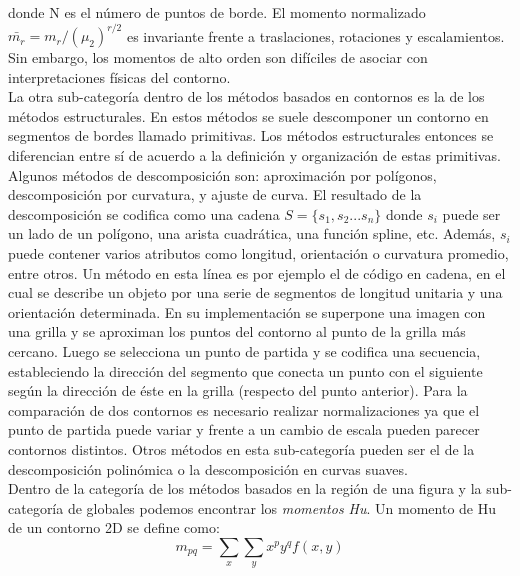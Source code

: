 donde N es el número de puntos de borde. El momento normalizado $\bar{m_r}=m_r / (\mu_2)^{r/2}$
es invariante frente a traslaciones, rotaciones y escalamientos. Sin 
embargo, los momentos de alto orden
son difíciles de asociar con interpretaciones físicas del contorno.\\
\indent La otra sub-categoría dentro de los métodos basados en contornos es la de los métodos estructurales.
En estos métodos se suele descomponer un contorno en segmentos de bordes llamado primitivas. Los métodos estructurales
entonces se diferencian entre sí de acuerdo a la definición y organización de estas primitivas. Algunos métodos
de descomposición son: aproximación por polígonos, descomposición por curvatura, y ajuste de curva. El resultado
de la descomposición se codifica como una cadena $S=\{s_1,s_2...s_n\}$ donde $s_i$ puede ser un lado de un polígono, una 
arista cuadrática, una función spline, etc. Además, $s_i$ puede 
contener varios atributos como longitud, orientación o curvatura 
promedio, entre otros.
Un método en esta línea es por ejemplo el de código en cadena, en el 
cual se describe un objeto por una serie de segmentos de longitud 
unitaria y una orientación determinada. 
En su implementación se superpone una imagen con una grilla y se aproximan los puntos del contorno al 
punto de la grilla más cercano. Luego se selecciona un punto de 
partida y se codifica una secuencia, estableciendo la dirección del segmento
que conecta un punto con el siguiente según la dirección de éste en 
la grilla (respecto del punto  anterior). Para la comparación de dos
contornos es necesario realizar normalizaciones ya que el punto de 
partida puede variar y frente a un cambio de escala pueden parecer 
contornos distintos. Otros métodos en esta sub-categoría pueden ser el de la descomposición polinómica o la descomposición en curvas suaves. \\
\indent Dentro de la categoría de los métodos basados en la región 
de una figura y la sub-categoría de globales podemos encontrar los \textit{momentos Hu}.
Un momento de Hu de un contorno 2D se define como:
\[
	m_{pq}=\sum_{x}{\sum_{y}{x^py^qf(x,y)}}
\]

